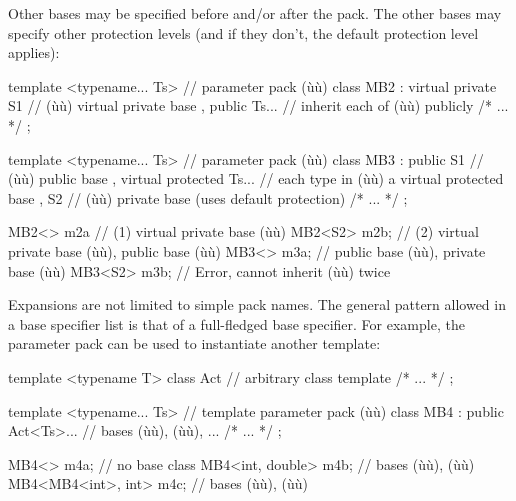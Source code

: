 Other bases may be specified before and/or after the pack. The other
bases may specify other protection levels (and if they don't, the
default protection level applies):

\begin{emcppslisting}
template <typename... Ts>      // parameter pack (ù{}ù)
class MB2
    : virtual private S1       // (ù{}ù) virtual private base
    , public Ts...             // inherit each of (ù{}ù) publicly
{ /* ... */ };

template <typename... Ts>      // parameter pack (ù{}ù)
class MB3
    : public S1                // (ù{}ù) public base
    , virtual protected Ts...  // each type in (ù{}ù) a virtual protected base
    , S2                       // (ù{}ù) private base (uses default protection)
{ /* ... */ };

MB2<>   m2a                    // (1) virtual private base (ù{}ù)
MB2<S2> m2b;                   // (2) virtual private base (ù{}ù), public base (ù{}ù)
MB3<>   m3a;                   // public base (ù{}ù), private base (ù{}ù)
MB3<S2> m3b;                   // Error, cannot inherit (ù{}ù) twice
\end{emcppslisting}
    

\noindent Expansions are not limited to simple pack names. The general pattern
allowed in a base specifier list is that of a full-fledged base
specifier. For example, the parameter pack can be used to instantiate
another template:

\begin{emcppslisting}
template <typename T>
class Act                       // arbitrary class template
{ /* ... */ };

template <typename... Ts>       // template parameter pack (ù{}ù)
class MB4
    : public Act<Ts>...         // bases (ù{}ù), (ù{}ù), ...
{ /* ... */ };

MB4<>                     m4a;  // no base class
MB4<int, double>          m4b;  // bases (ù{}ù), (ù{}ù)
MB4<MB4<int>, int>        m4c;  // bases (ù{}ù), (ù{}ù)
\end{emcppslisting}
    


